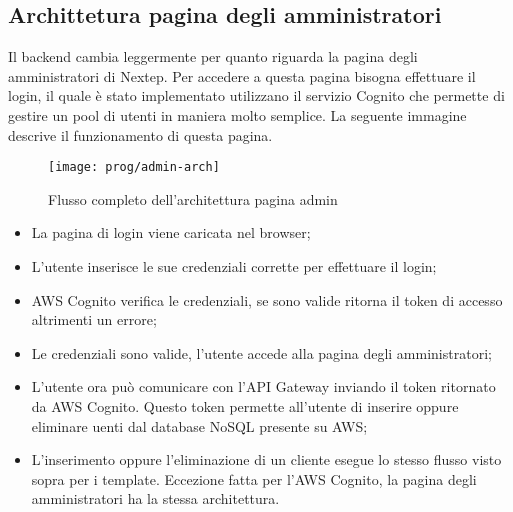 \subsection{Archittetura pagina degli amministratori}
Il backend cambia leggermente per quanto riguarda la pagina degli amministratori di Nextep. Per accedere a questa pagina bisogna effettuare il login, il quale è stato implementato utilizzano il servizio Cognito che permette di gestire un pool di utenti in maniera molto semplice. La seguente immagine descrive il funzionamento di questa pagina. 
\begin{figure}[!h] 
	\centering 
	\texttt{[image: prog/admin-arch]} 
	\caption{Flusso completo dell'architettura pagina admin}
\end{figure} 
\begin{itemize}
	\item La pagina di login viene caricata nel browser;
	\item L'utente inserisce le sue credenziali corrette per effettuare il login;
	\item AWS Cognito verifica le credenziali, se sono valide ritorna il token di accesso altrimenti un errore;
	\item Le credenziali sono valide, l'utente accede alla pagina degli amministratori;
	\item L'utente ora può comunicare con l'API Gateway inviando il token ritornato da AWS Cognito. Questo token permette all'utente di inserire oppure eliminare uenti dal database NoSQL presente su AWS;
	\item L'inserimento oppure l'eliminazione di un cliente esegue lo stesso flusso visto sopra per i template. Eccezione fatta per l'AWS Cognito, la pagina degli amministratori ha la stessa architettura.
\end{itemize}
